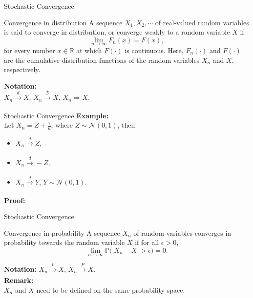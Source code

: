 \documentclass [aspectratio=169]{beamer}
\begin{document}
\begin{frame}{Stochastic Convergence}
    \begin{block}{Convergence in distribution}
    A sequence $X_1, X_2, \cdots$ of real-valued random variables is said to converge in distribution, or converge weakly to a random variable $X$ if
$$
{\displaystyle \lim _{n\to \infty }F_{n}(x)=F(x),}
$$
for every number $x \in \mathbb{R}$ at which $F(\cdot)$ is continuous. Here, $F_n(\cdot)$ and $F(\cdot)$ are the cumulative distribution functions of the random variables $X_n$ and $X$, respectively.
\end{block}
\vspace{0.1in}
\textbf{Notation:}\\
$X_n \xrightarrow[]{d} X$, \quad $X_n \xrightarrow[]{\mathcal{D}} X$, \quad $X_n \Rightarrow X$. \\
\vspace{0.1in}
\end{frame}




\begin{frame}{Stochastic Convergence}
    \textbf{Example:}\\
    Let $X_n = Z + \frac{1}{n}$, where $Z \sim \mathcal{N}(0,1)$, then 
    \begin{itemize}
        \item $X_n \xrightarrow[]{d} Z$,
        \item $X_n \xrightarrow[]{d} -Z$,
        \item $X_n \xrightarrow[]{d} Y$, $Y \sim \mathcal{N}(0,1)$.
    \end{itemize}
    \vspace{0.1in}
    \textbf{Proof:}\\
    \vspace{1in}
\end{frame}


\begin{frame}{Stochastic Convergence}
    \begin{block}{Convergence in probability}
    A sequence $X_n$ of random variables converges in probability towards the random variable $X$ if for all $\epsilon > 0$, 
    $$
    \lim _{n\to \infty }\mathbb{P} {\big (}|X_{n}-X|>\epsilon {\big )}=0.
    $$
    \end{block}
    \vspace{0.1in}
    \textbf{Notation:}
    $X_n \xrightarrow[]{p} X$, \quad $X_n \xrightarrow[]{P} X$.\\
\vspace{0.1in}
\textbf{Remark:}\\
$X_n$ and $X$ need to be defined on the same probability space. 
\end{frame}
\end{document}
